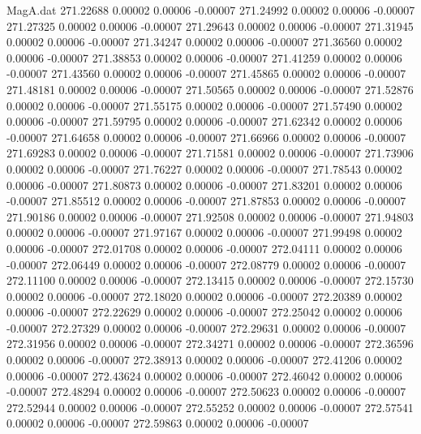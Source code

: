 \begin{filecontents}{MagA.dat}
 271.22688    0.00002    0.00006   -0.00007
 271.24992    0.00002    0.00006   -0.00007
 271.27325    0.00002    0.00006   -0.00007
 271.29643    0.00002    0.00006   -0.00007
 271.31945    0.00002    0.00006   -0.00007
 271.34247    0.00002    0.00006   -0.00007
 271.36560    0.00002    0.00006   -0.00007
 271.38853    0.00002    0.00006   -0.00007
 271.41259    0.00002    0.00006   -0.00007
 271.43560    0.00002    0.00006   -0.00007
 271.45865    0.00002    0.00006   -0.00007
 271.48181    0.00002    0.00006   -0.00007
 271.50565    0.00002    0.00006   -0.00007
 271.52876    0.00002    0.00006   -0.00007
 271.55175    0.00002    0.00006   -0.00007
 271.57490    0.00002    0.00006   -0.00007
 271.59795    0.00002    0.00006   -0.00007
 271.62342    0.00002    0.00006   -0.00007
 271.64658    0.00002    0.00006   -0.00007
 271.66966    0.00002    0.00006   -0.00007
 271.69283    0.00002    0.00006   -0.00007
 271.71581    0.00002    0.00006   -0.00007
 271.73906    0.00002    0.00006   -0.00007
 271.76227    0.00002    0.00006   -0.00007
 271.78543    0.00002    0.00006   -0.00007
 271.80873    0.00002    0.00006   -0.00007
 271.83201    0.00002    0.00006   -0.00007
 271.85512    0.00002    0.00006   -0.00007
 271.87853    0.00002    0.00006   -0.00007
 271.90186    0.00002    0.00006   -0.00007
 271.92508    0.00002    0.00006   -0.00007
 271.94803    0.00002    0.00006   -0.00007
 271.97167    0.00002    0.00006   -0.00007
 271.99498    0.00002    0.00006   -0.00007
 272.01708    0.00002    0.00006   -0.00007
 272.04111    0.00002    0.00006   -0.00007
 272.06449    0.00002    0.00006   -0.00007
 272.08779    0.00002    0.00006   -0.00007
 272.11100    0.00002    0.00006   -0.00007
 272.13415    0.00002    0.00006   -0.00007
 272.15730    0.00002    0.00006   -0.00007
 272.18020    0.00002    0.00006   -0.00007
 272.20389    0.00002    0.00006   -0.00007
 272.22629    0.00002    0.00006   -0.00007
 272.25042    0.00002    0.00006   -0.00007
 272.27329    0.00002    0.00006   -0.00007
 272.29631    0.00002    0.00006   -0.00007
 272.31956    0.00002    0.00006   -0.00007
 272.34271    0.00002    0.00006   -0.00007
 272.36596    0.00002    0.00006   -0.00007
 272.38913    0.00002    0.00006   -0.00007
 272.41206    0.00002    0.00006   -0.00007
 272.43624    0.00002    0.00006   -0.00007
 272.46042    0.00002    0.00006   -0.00007
 272.48294    0.00002    0.00006   -0.00007
 272.50623    0.00002    0.00006   -0.00007
 272.52944    0.00002    0.00006   -0.00007
 272.55252    0.00002    0.00006   -0.00007
 272.57541    0.00002    0.00006   -0.00007
 272.59863    0.00002    0.00006   -0.00007

\end{filecontents}
